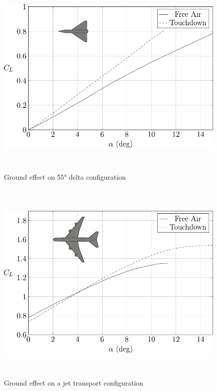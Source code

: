 \begin{figure}[htbp]
	\centering
	\includegraphics[height=10cm, keepaspectratio ]{Immagini/Capitolo2/2_2-GroundEffectDeltaConf} 
	\caption{Ground effect on 55°  delta configuration} %
	\label{fig:figura2_2} %
\end{figure}

\begin{figure}[htbp]
	\centering
	\includegraphics[height=10cm, keepaspectratio ]{Immagini/Capitolo2/2_3-GroundEffectJetTranspConf} 
	\caption{Ground effect on a jet transport configuration} %
	\label{fig:figura2_3} %
\end{figure}

